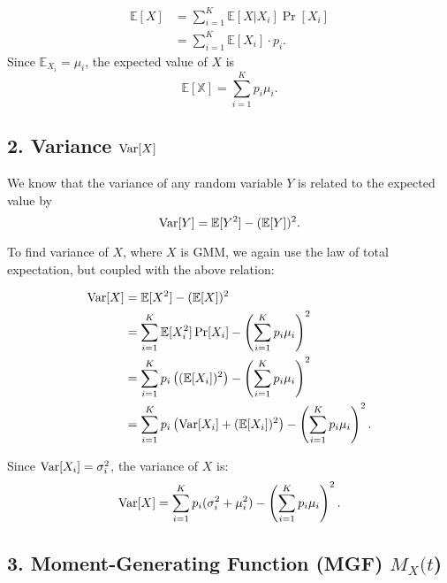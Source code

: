 \begin{equation*}
    \begin{aligned}
        \mathbb{E}[X] &= \sum_{i=1}^{K}\mathbb{E}\left[X|X_i\right]\Pr[X_i] \\
        &= \sum_{i=1}^{K}\mathbb{E}[X_i]\cdot p_i.
    \end{aligned}
\end{equation*}
Since $\mathbb{E}_{X_i} = \mu_i$, the expected value of $X$ is
\begin{equation*}
    \mathbb{E[X]} = \sum_{i=1}^{K}p_i\mu_i. 
\end{equation*}

\subsection*{2. Variance $\text{Var}[X]$}

We know that the variance of any random variable $Y$ is related to the expected
value by
\begin{equation*}
    \text{Var}[Y] = \mathbb{E}[Y^2] - (\mathbb{E}[Y])^2.
\end{equation*}

To find variance of $X$, where $X$ is GMM, we again use the law of total
expectation, but coupled with the above relation:

\begin{equation*}
    \begin{aligned}
        \text{Var}[X] &= \mathbb{E}[X^2] - (\mathbb{E}[X])^2 \\
        &= \sum_{i=1}^{K}\mathbb{E}[X_i^2]\Pr[X_i] -
        \left(\sum_{i=1}^{K}p_i\mu_i\right)^2 \\
        &= \sum_{i=1}^{K}p_i\left((\mathbb{E}[X_i])^2\right) -
        \left(\sum_{i=1}^{K}p_i\mu_i\right)^2 \\
        &= \sum_{i=1}^{K}p_i\left(\text{Var}[X_i]+(\mathbb{E}[X_i])^2\right) -
        \left(\sum_{i=1}^{K}p_i\mu_i\right)^2.
    \end{aligned}
\end{equation*}

Since $\text{Var}[X_i] = \sigma_i^2$, the variance of $X$ is:
\begin{equation*}
    \text{Var}[X] = \sum_{i=1}^K p_i (\sigma_i^2 + \mu_i^2) - \left( \sum_{i=1}^K p_i
    \mu_i \right)^2.
\end{equation*}

\subsection*{3. Moment-Generating Function (MGF) $M_X(t$)}

